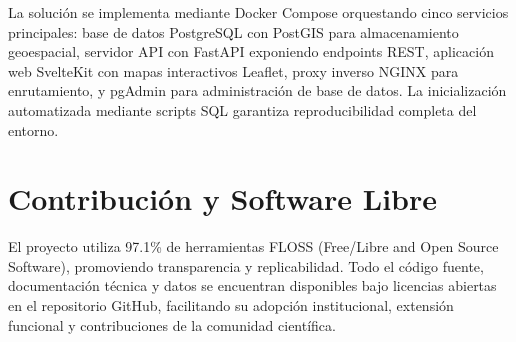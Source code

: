 La solución se implementa mediante Docker Compose orquestando cinco servicios principales: base de datos PostgreSQL con PostGIS para almacenamiento geoespacial, servidor API con FastAPI exponiendo endpoints REST, aplicación web SvelteKit con mapas interactivos Leaflet, proxy inverso NGINX para enrutamiento, y pgAdmin para administración de base de datos. La inicialización automatizada mediante scripts SQL garantiza reproducibilidad completa del entorno.

\section*{Contribución y Software Libre}

El proyecto utiliza 97.1\% de herramientas FLOSS (Free/Libre and Open Source Software), promoviendo transparencia y replicabilidad. Todo el código fuente, documentación técnica y datos se encuentran disponibles bajo licencias abiertas en el repositorio GitHub, facilitando su adopción institucional, extensión funcional y contribuciones de la comunidad científica.

